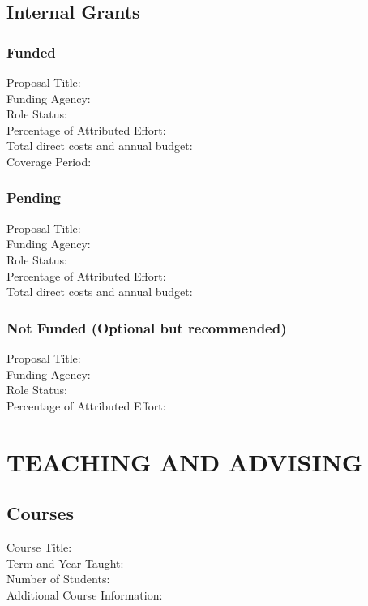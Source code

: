 \documentclass[a4paper,9pt]{extarticle}
\newenvironment{subs} %
  {\adjustwidth{2em}{0pt}}
  {\endadjustwidth}
\begin{document}
    \subsection*{Internal Grants}
    \begin{subs}
        \subsubsection*{Funded}
            Proposal Title:\\
            Funding Agency:\\
            Role Status: \\
            Percentage of Attributed Effort: \\
            Total direct costs and annual budget:\\
            Coverage Period:
        \subsubsection*{Pending}
            Proposal Title:\\
            Funding Agency:\\
            Role Status: \\
            Percentage of Attributed Effort: \\
            Total direct costs and annual budget:
        \subsubsection*{Not Funded (Optional but recommended)}
            Proposal Title:\\
            Funding Agency:\\
            Role Status: \\
            Percentage of Attributed Effort: 
    \end{subs}

\section*{TEACHING AND ADVISING}
    \subsection*{Courses}
        Course Title:\\
        Term and Year Taught:\\
        Number of Students:\\
        Additional Course Information:
\end{document}
